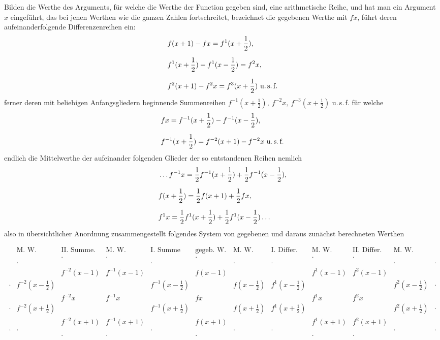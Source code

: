 Bilden die Werthe des Arguments, für welche die Werthe der Function gegeben sind, eine arithmetische
Reihe, und hat man ein Argument $x$ eingeführt, das bei jenen Werthen wie die ganzen Zahlen
fortschreitet, bezeichnet die gegebenen Werthe mit $fx$, führt deren aufeinanderfolgende Differenzenreihen
ein:
\[
\begin{aligned}
&f(x+1)-fx=f^{1}(x+\frac12),\\[6pt]
&f^{1}(x+\frac12)-f^{1}(x-\frac12)=f^{2}x,\\[6pt]
&f^{2}(x+1)-f^{2}x=f^{3}(x+\frac12)\ \mbox{u.\,s.\,f.}
\end{aligned}
\]
ferner deren mit beliebigen Anfangsgliedern beginnende Summenreihen
$f^{-1}(x+\tfrac12),\ f^{-2}x,\ f^{-3}(x+\tfrac12)$ u.\,s.\,f.
für welche
\[
\begin{aligned}
&fx=f^{-1}(x+\frac12)-f^{-1}(x-\frac12),\\[6pt]
&f^{-1}(x+\frac12)=f^{-2}(x+1)-f^{-2}x\ \mbox{u.\,s.\,f.}
\end{aligned}
\]
endlich die Mittelwerthe der aufeinander folgenden Glieder der so entstandenen Reihen nemlich
\[
\begin{aligned}
&\mathinner{.\,.\,.} f^{-1}x=\frac12f^{-1}(x+\frac12)+\frac12f^{-1}(x-\frac12),\\[6pt]
&f(x+\frac12)=\frac12f(x+1)+\frac12fx,\\[6pt]
&f^{1}x=\frac12f^{1}(x+\frac12)+\frac12f^{1}(x-\frac12)\mathinner{.\,.\,.}
\end{aligned}
\]
also in übersichtlicher Anordnung zusammengestellt folgendes System von gegebenen und daraus zunächst
berechneten Werthen

\begin{landscape}\thispagestyle{empty}\begingroup\fontsize{9}{12}\selectfont\setlength{\arraycolsep}{3pt}\renewcommand{\arraystretch}{1.3}
\[
\begin{array}{ccc|cc||cc||cc|ccc}
 & \mbox{M. W.} & \mbox{II. Summe.} & \mbox{M. W.} & \mbox{I. Summe} & \mbox{gegeb. W.} & \mbox{M. W.} & \mbox{I. Differ.} & \mbox{M. W.} & \mbox{II. Differ.} & \mbox{M. W.} & \\
 & & \cdot & \cdot & & \cdot & & & \cdot & \cdot & & \\
 & \cdot & & & \cdot & & \cdot & \cdot & & & \cdot & \cdot \\
 & & f^{-2}(x-1) & f^{-1}(x-1) & & f(x-1) & & & f^{1}(x-1) & f^{2}(x-1) & & \\
\cdot & f^{-2}(x-\tfrac12) & & & f^{-1}(x-\tfrac12) & & f(x-\tfrac12) & f^{1}(x-\tfrac12) & & & f^{2}(x-\tfrac12) & \cdot \\
 & & f^{-2}x & f^{-1}x & & fx & & & f^{1}x & f^{2}x & & \\
\cdot & f^{-2}(x+\tfrac12) & & & f^{-1}(x+\tfrac12) & & f(x+\tfrac12) & f^{1}(x+\tfrac12) & & & f^{2}(x+\tfrac12) & \cdot \\
 & & f^{-2}(x+1) & f^{-1}(x+1) & & f(x+1) & & & f^{1}(x+1) & f^{2}(x+1) & & \\
\cdot & \cdot & & & \cdot & & \cdot & \cdot & & & \cdot & \cdot \\
 & & \cdot & \cdot & & \cdot & & & \cdot & \cdot & &
\end{array}
\]
\endgroup\end{landscape}

